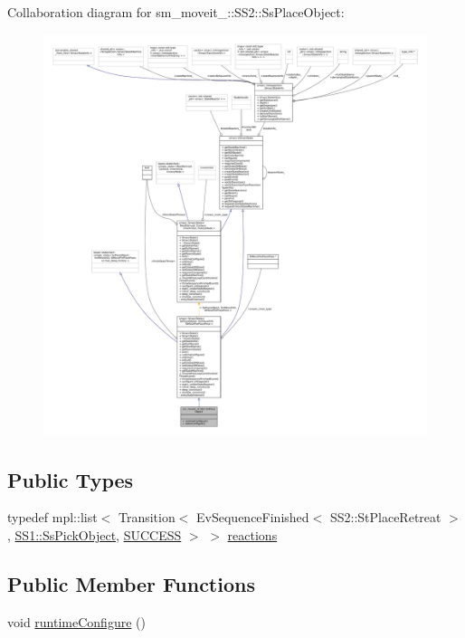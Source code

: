 Collaboration diagram for sm\+\_\+moveit\+\_\+:\+:S\+S2\+:\+:Ss\+Place\+Object\+:
\nopagebreak
\begin{figure}[H]
\begin{center}
\leavevmode
\includegraphics[width=350pt]{structsm__moveit__4_1_1SS2_1_1SsPlaceObject__coll__graph}
\end{center}
\end{figure}
\subsection*{Public Types}
\begin{DoxyCompactItemize}
\item 
typedef mpl\+::list$<$ Transition$<$ Ev\+Sequence\+Finished$<$ S\+S2\+::\+St\+Place\+Retreat $>$, \hyperlink{structsm__moveit__4_1_1SS1_1_1SsPickObject}{S\+S1\+::\+Ss\+Pick\+Object}, \hyperlink{classSUCCESS}{S\+U\+C\+C\+E\+SS} $>$ $>$ \hyperlink{structsm__moveit__4_1_1SS2_1_1SsPlaceObject_af78f83655d184e9ed816c64ea882e015}{reactions}
\end{DoxyCompactItemize}
\subsection*{Public Member Functions}
\begin{DoxyCompactItemize}
\item 
void \hyperlink{structsm__moveit__4_1_1SS2_1_1SsPlaceObject_a930b4228defad612e6fe391e78345819}{runtime\+Configure} ()
\end{DoxyCompactItemize}
